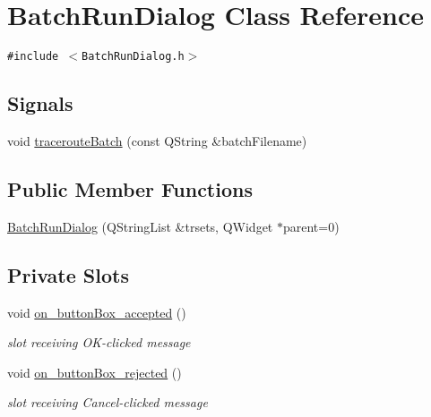 \hypertarget{classBatchRunDialog}{
\section{BatchRunDialog Class Reference}
\label{classBatchRunDialog}
}
{\tt \#include $<$BatchRunDialog.h$>$}

\subsection*{Signals}
\begin{CompactItemize}
\item 
void \hyperlink{classBatchRunDialog_80b5c170f4a32dfdd3be57ab18e376cf}{tracerouteBatch} (const QString \&batchFilename)
\end{CompactItemize}
\subsection*{Public Member Functions}
\begin{CompactItemize}
\item 
\hyperlink{classBatchRunDialog_39e08a5d575b43830615ccc1e4a28d39}{BatchRunDialog} (QStringList \&trsets, QWidget $\ast$parent=0)
\end{CompactItemize}
\subsection*{Private Slots}
\begin{CompactItemize}
\item 
\hypertarget{classBatchRunDialog_b52ece91fa455b57e6d04130bac90c71}{
void \hyperlink{classBatchRunDialog_b52ece91fa455b57e6d04130bac90c71}{on\_\-buttonBox\_\-accepted} ()}
\label{classBatchRunDialog_b52ece91fa455b57e6d04130bac90c71}

\begin{CompactList}\small\item\em slot receiving OK-clicked message \item\end{CompactList}\item 
\hypertarget{classBatchRunDialog_3e1f937ff56b551bf7dea076ceb8c147}{
void \hyperlink{classBatchRunDialog_3e1f937ff56b551bf7dea076ceb8c147}{on\_\-buttonBox\_\-rejected} ()}
\label{classBatchRunDialog_3e1f937ff56b551bf7dea076ceb8c147}

\begin{CompactList}\small\item\em slot receiving Cancel-clicked message \item\end{CompactList}\end{CompactItemize}


